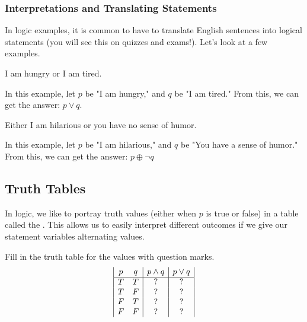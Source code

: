 \subsubsection{Interpretations and Translating Statements}
In logic examples, it is common to have to translate English sentences into logical statements (you will see this on quizzes and exams!). Let's look at a few examples.

\begin{example}
    I am hungry or I am tired.
\end{example}

In this example, let \(p\) be "I am hungry," and \(q\) be "I am tired." From this, we can get the answer: $p\lor q.$\\

\begin{example}
    Either I am hilarious or you have no sense of humor.
\end{example}

In this example, let \(p\) be "I am hilarious," and \(q\) be "You have a sense of humor." From this, we can get the answer: $p \oplus \neg{q}$\\


\subsection{Truth Tables}
In logic, we like to portray truth values (either when \(p\) is true or false) in a table called the . This allows us to easily interpret different outcomes if we give our statement variables alternating values.
\begin{example}
Fill in the truth table for the values with question marks.
\begin{displaymath}
\begin{array}{|c c|c|c|}
p & q & p \land q & p \lor q\\ %
\hline %
T & T & ? & ?\\
T & F & ? & ?\\
F & T & ? & ?\\
F & F & ? & ?\\
\end{array}
\end{displaymath}
\end{example}


